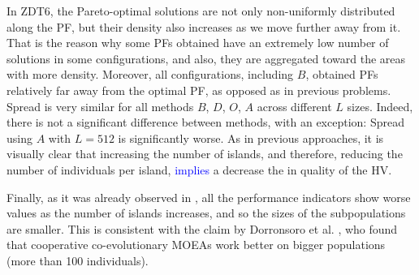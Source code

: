 \documentclass[preprint]{elsarticle}
\begin{document}
In ZDT6, the Pareto-optimal solutions are not only non-uniformly distributed along the PF, but their density also increases as we move further away from it. That is the reason why some PFs obtained have an extremely low number of solutions in some configurations, and also, they are aggregated toward the areas with more density. Moreover, all configurations, including $B$, obtained PFs relatively far away from the optimal PF, as opposed as in previous problems. Spread is very similar for all methods $B$, $D$, $O$, $A$ across different $L$ sizes. Indeed, there is not a significant difference between methods, with an exception: Spread using $A$ with $L=512$ is significantly worse. As in previous approaches, it is visually clear that increasing the number of islands, and therefore, reducing the number of individuals per island, \textcolor{blue}{implies} a decrease the in quality of the HV.

Finally, as it was already observed in \citep{Garcia16hpmoon}, all the performance indicators show worse values as the number of islands increases, and so the  sizes of the subpopulations are smaller. This is consistent with the claim by Dorronsoro et al. \citep{Dorronsoro13superlinear}, who found that cooperative co-evolutionary MOEAs work better on bigger populations (more than 100 individuals).



\end{document}
